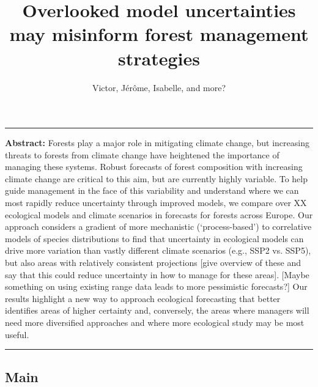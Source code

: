 \documentclass[11pt,letter]{article}
\begin{document}
\title{Overlooked model uncertainties may misinform forest management strategies}

\author{Victor, Jérôme, Isabelle, and more?}
\date{}
\maketitle 


\noindent\rule{\textwidth}{0.3pt}
\textbf{Abstract:} Forests play a major role in mitigating climate change, but increasing threats to forests from climate change have heightened the importance of managing these systems. Robust forecasts of forest composition with increasing climate change are critical to this aim, but are currently highly variable. To help guide management in the face of this variability and understand where we can most rapidly reduce uncertainty through improved models, we compare over XX ecological models and climate scenarios in forecasts for forests across Europe. Our approach considers a gradient of more mechanistic (`process-based') to correlative models of species distributions to find that uncertainty in ecological models can drive more variation than vastly different climate scenarios (e.g., SSP2 vs. SSP5), but also areas with relatively consistent projections [give overview of these and say that this could reduce uncertainty in how to manage for these areas]. [Maybe something on using existing range data leads to more pessimistic forecasts?] Our results highlight a new way to approach ecological forecasting that better identifies areas of higher certainty and, conversely, the areas where managers will need more diversified approaches and where more ecological study may be most useful. %

\noindent\rule{\textwidth}{0.3pt}

\linenumbers

\subsection*{Main}
%
\end{document}
